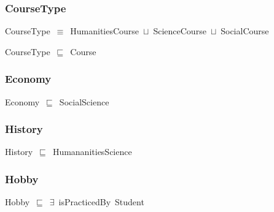 \documentclass{article}
\begin{document}
\subsubsection*{CourseType}

CourseType~\ensuremath{\equiv}~HumanitiesCourse~\ensuremath{\sqcup}~ScienceCourse~\ensuremath{\sqcup}~SocialCourse

CourseType~\ensuremath{\sqsubseteq}~Course~

\subsubsection*{Economy}

Economy~\ensuremath{\sqsubseteq}~SocialScience~

\subsubsection*{History}

History~\ensuremath{\sqsubseteq}~HumananitiesScience~

\subsubsection*{Hobby}

Hobby~\ensuremath{\sqsubseteq}~\ensuremath{\exists}~isPracticedBy~Student~
\end{document}
